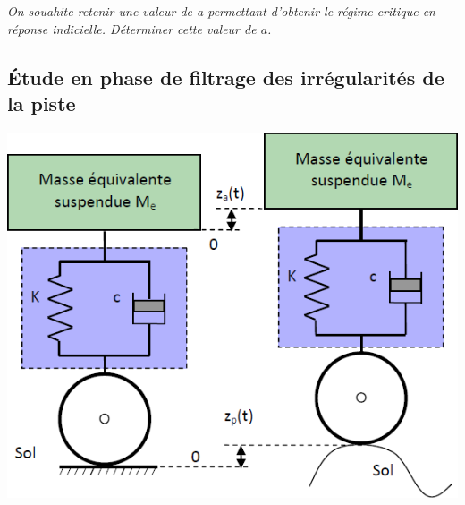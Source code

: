 \documentclass[10pt,fleqn]{article} %
\begin{document}
\begin{multicols}{2}
%
%
%
%
%
%




\subparagraph{}
\textit{On souahite retenir une valeur de a permettant d’obtenir le régime critique en réponse indicielle. Déterminer cette valeur de $a$.}
\ifprof
\begin{corrige}
\end{corrige}
\else
\fi


\subsection*{Étude en phase de filtrage des irrégularités de la piste}

\begin{center}
\includegraphics[width=.7\linewidth]{images/img_05}
\end{center}


\end{multicols}
\end{document}

